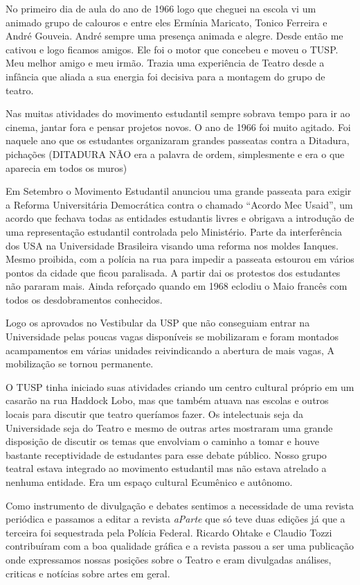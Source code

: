 No primeiro dia de aula do ano de 1966 logo que cheguei na escola vi um
animado grupo de calouros e entre eles Ermínia Maricato, Tonico Ferreira
e André Gouveia. André sempre uma presença animada e alegre. Desde então
me cativou e logo ficamos amigos. Ele foi o motor que concebeu e moveu o
TUSP. Meu melhor amigo e meu irmão. Trazia uma experiência de Teatro
desde a infância que aliada a sua energia foi decisiva para a montagem
do grupo de teatro.

Nas muitas atividades do movimento estudantil sempre sobrava tempo para
ir ao cinema, jantar fora e pensar projetos novos. O ano de 1966 foi
muito agitado. Foi naquele ano que os estudantes organizaram grandes
passeatas contra a Ditadura, pichações (DITADURA NÃO era a palavra de
ordem, simplesmente e era o que aparecia em todos os muros)

Em Setembro o Movimento Estudantil anunciou uma grande passeata para
exigir a Reforma Universitária Democrática contra o chamado “Acordo Mec
Usaid”, um acordo que fechava todas as entidades estudantis livres e
obrigava a introdução de uma representação estudantil controlada pelo
Ministério. Parte da interferência dos USA na Universidade Brasileira
visando uma reforma nos moldes Ianques. Mesmo proibida, com a polícia na
rua para impedir a passeata estourou em vários pontos da cidade que
ficou paralisada. A partir dai os protestos dos estudantes não pararam
mais. Ainda reforçado quando em 1968 eclodiu o Maio francês com todos os
desdobramentos conhecidos.

Logo os aprovados no Vestibular da USP que não conseguiam entrar na
Universidade pelas poucas vagas disponíveis se mobilizaram e foram
montados acampamentos em várias unidades reivindicando a abertura de
mais vagas, A mobilização se tornou permanente.

O TUSP tinha iniciado suas atividades criando um centro cultural próprio
em um casarão na rua Haddock Lobo, mas que também atuava nas escolas e
outros locais para discutir que teatro queríamos fazer. Os intelectuais
seja da Universidade seja do Teatro e mesmo de outras artes mostraram
uma grande disposição de discutir os temas que envolviam o caminho a
tomar e houve bastante receptividade de estudantes para esse debate
público. Nosso grupo teatral estava integrado ao movimento estudantil
mas não estava atrelado a nenhuma entidade. Era um espaço cultural
Ecumênico e autônomo.

Como instrumento de divulgação e debates sentimos a necessidade de uma
revista periódica e passamos a editar a revista \textit{aParte} que só teve
duas edições já que a terceira foi sequestrada pela Polícia Federal.
Ricardo Ohtake e Claudio Tozzi contribuíram com a boa qualidade gráfica
e a revista passou a ser uma publicação onde expressamos nossas posições
sobre o Teatro e eram divulgadas análises, criticas e notícias sobre
artes em geral.


